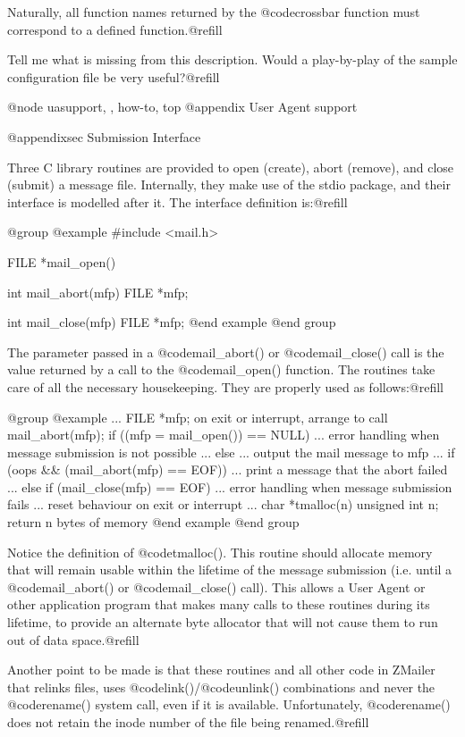 {{Naturally, all function names returned by the @code{crossbar} function must
correspond to a defined function.@refill

Tell me what is missing from this description.  Would a play-by-play of the
sample configuration file be very useful?@refill

@node uasupport, , how-to, top
@appendix User Agent support

@appendixsec Submission Interface

Three C library routines are provided to open (create), abort (remove), and
close (submit) a message file.  Internally, they make use of the stdio package,
and their interface is modelled after it.  The interface definition is:@refill

@group
@example
#include <mail.h>

FILE *mail_open()

int mail_abort(mfp)
FILE *mfp;

int mail_close(mfp)
FILE *mfp;
@end example
@end group

The parameter passed in a @code{mail_abort()} or @code{mail_close()} call is
the value returned by a call to the @code{mail_open()} function.
The routines take care of all the necessary housekeeping.
They are properly used as follows:@refill

@group
@example
...
FILE *mfp;
on exit or interrupt, arrange to call mail_abort(mfp);
if ((mfp = mail_open()) == NULL) {
    ... error handling when message submission is not possible ...
} else {
    ... output the mail message to mfp ...
    if (oops && (mail_abort(mfp) == EOF))
        ... print a message that the abort failed ...
    else if (mail_close(mfp) == EOF)
        ... error handling when message submission fails ...
}
reset behaviour on exit or interrupt
...
char *tmalloc(n) unsigned int n; { return n bytes of memory }
@end example
@end group

Notice the definition of @code{tmalloc()}.  This routine should allocate
memory that will remain usable within the lifetime of the message submission
(i.e. until a @code{mail_abort()} or @code{mail_close()} call).  This allows
a User Agent or other application program that makes many calls to these
routines during its lifetime, to provide an alternate byte allocator that
will not cause them to run out of data space.@refill

Another point to be made is that these routines and all other code in
ZMailer that relinks files, uses @code{link()}/@code{unlink()} combinations
and never the @code{rename()} system call, even if it is available.
Unfortunately, @code{rename()} does not retain the inode number of the
file being renamed.@refill

}}
